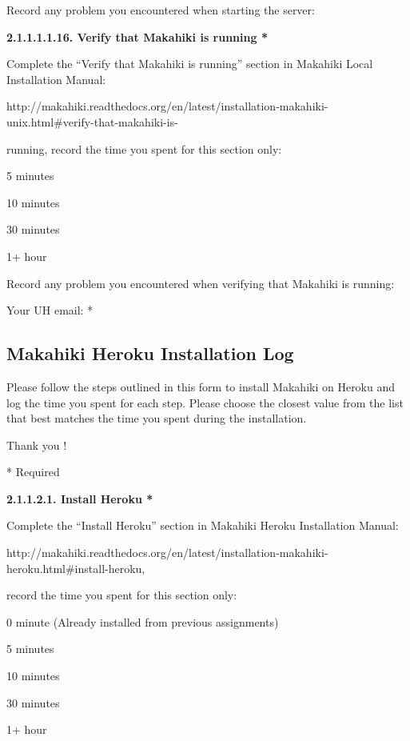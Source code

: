 Record any problem you encountered when starting the server: \underline{\hspace{4cm}}

{\bf 2.1.1.1.1.16. Verify that Makahiki is running *}

Complete the ``Verify that Makahiki is running'' section in Makahiki Local Installation Manual:

http://makahiki.readthedocs.org/en/latest/installation-makahiki-unix.html\#verify-that-makahiki-is-

running,  record the time you spent for this section only:

\begin{radiobutton}
\item 5 minutes
\item  10 minutes
\item  30 minutes
\item  1+ hour
\end{radiobutton}

Record any problem you encountered when verifying that Makahiki is running: \underline{\hspace{3cm}}

Your UH email: * \underline{\hspace{4cm}}

\subsection{Makahiki Heroku Installation Log}

Please follow the steps outlined in this form to install Makahiki on Heroku and log the time you spent for each step.
Please choose the closest value from the list that best matches the time you spent during the installation.

Thank you !

* Required

{\bf 2.1.1.2.1. Install Heroku *}

Complete the ``Install Heroku'' section in Makahiki Heroku Installation Manual:

http://makahiki.readthedocs.org/en/latest/installation-makahiki-heroku.html\#install-heroku, 

record the time you spent for this section only:

\begin{radiobutton}
\item 0 minute (Already installed from previous assignments)
\item 5 minutes
\item  10 minutes
\item  30 minutes
\item  1+ hour
\end{radiobutton}

